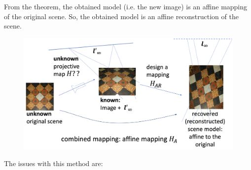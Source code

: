 \documentclass[12pt, a4paper]{report}
\newtheorem[style=M,bodystyle=\normalfont]{theorem}{Theorem}
\newtheorem[style=M,bodystyle=\normalfont]{corollary}{Corollary}
\newtheorem[style=M,bodystyle=\normalfont]{lemma}{Lemma}
\newtheorem[style=M,bodystyle=\normalfont]{definition}{Definition}
\begin{document}
    From the theorem, the obtained model (i.e. the new image) is an affine mapping of the original scene. So, the obtained model is an 
    affine reconstruction of the scene. 
    \begin{figure}[H]
        \centering
        \includegraphics[width=0.75\linewidth]{images/HAR.png}
    \end{figure}
    The issues with this method are: 
\end{document}
